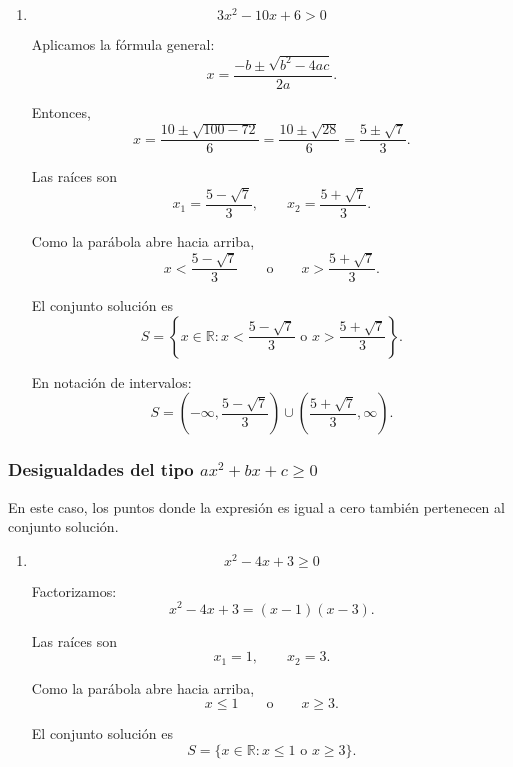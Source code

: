 \documentclass[12pt]{article}
\begin{document}
{\begin{enumerate}
En notación de intervalos:
\[
\boxed{
S=
(-\infty,-1)
\cup
\left(\frac{1}{2},\infty\right).
}
\]

Representación gráfica:
\[
\longleftarrow\!\!=\!\!=\!\circ
\quad -1
\qquad\qquad
\frac{1}{2}\quad
\circ\!\!=\!\!=\!\longrightarrow
\]

\item
\[
3x^2-10x+6>0
\]

Aplicamos la fórmula general:
\[
x=
\frac{-b\pm\sqrt{b^2-4ac}}{2a}.
\]

Entonces,
\[
x
=
\frac{10\pm\sqrt{100-72}}{6}
=
\frac{10\pm\sqrt{28}}{6}
=
\frac{5\pm\sqrt{7}}{3}.
\]

Las raíces son
\[
x_1=\frac{5-\sqrt{7}}{3},
\qquad
x_2=\frac{5+\sqrt{7}}{3}.
\]

Como la parábola abre hacia arriba,
\[
x<
\frac{5-\sqrt{7}}{3}
\qquad\text{o}\qquad
x>
\frac{5+\sqrt{7}}{3}.
\]

El conjunto solución es
\[
\boxed{
S=
\left\{
x\in\mathbb{R}:
x<
\frac{5-\sqrt{7}}{3}
\text{ o }
x>
\frac{5+\sqrt{7}}{3}
\right\}.
}
\]

En notación de intervalos:
\[
\boxed{
S=
\left(
-\infty,
\frac{5-\sqrt{7}}{3}
\right)
\cup
\left(
\frac{5+\sqrt{7}}{3},
\infty
\right).
}
\]

\end{enumerate}

\subsubsection*{Desigualdades del tipo \(ax^2+bx+c\geq 0\)}

En este caso, los puntos donde la expresión es igual a cero también
pertenecen al conjunto solución.

\begin{enumerate}

\item
\[
x^2-4x+3\geq0
\]

Factorizamos:
\[
x^2-4x+3=(x-1)(x-3).
\]

Las raíces son
\[
x_1=1,
\qquad
x_2=3.
\]

Como la parábola abre hacia arriba,
\[
x\leq1
\qquad\text{o}\qquad
x\geq3.
\]

El conjunto solución es
\[
\boxed{
S=
\{x\in\mathbb{R}:x\leq1\text{ o }x\geq3\}.
}
\]


\end{enumerate}}
\end{document}
